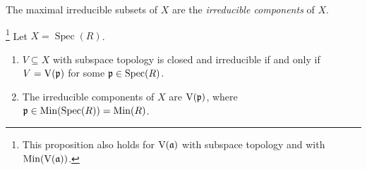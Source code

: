 \begin{definition}\label{2.41}
    The maximal irreducible subsets of $X$ are the \emph{irreducible components} of $X$.
\end{definition}

\begin{proposition}\label{2.42}\footnote[2]{This proposition also holds for $\operatorname{V}(\mathfrak{a})$ with subspace topology and with $\operatorname{Min}(\operatorname{V}(\mathfrak{a}))$.}
    Let $X = \operatorname{Spec}(R)$.
    \begin{enumerate}
        \item\label{2.42a} $V \subseteq X$ with subspace topology is closed and irreducible if and only if $V = \operatorname{V}(\mathfrak{p})$ for some $\mathfrak{p} \in \operatorname{Spec}(R)$.
        \item\label{2.42b} The irreducible components of $X$ are $\operatorname{V}(\mathfrak{p})$, where $\mathfrak{p} \in \operatorname{Min}(\operatorname{Spec}(R)) = \operatorname{Min}(R)$.
    \end{enumerate}
\end{proposition}

